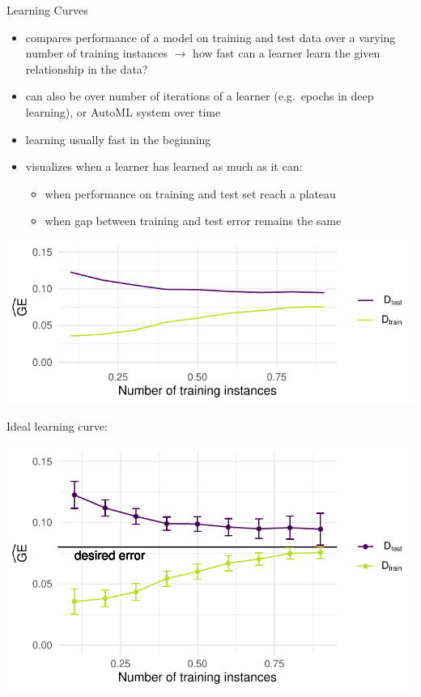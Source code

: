     \begin{frame}[c,allowframebreaks]{Learning Curves}

    \begin{itemize}
    \item compares performance of a model on training and test data over a varying number of training instances $\rightarrow$ how fast can a learner learn the given relationship in the data?
    \item can also be over number of iterations of a learner (e.g.\ epochs in
        deep learning), or AutoML system over time
    \item learning usually fast in the beginning
    \item visualizes when a learner has learned as much as it can:
    \begin{itemize}
    \item when performance on training and test set reach a plateau
    \item when gap between training and test error remains the same
    \end{itemize}
    \end{itemize}

    \begin{center}
    \includegraphics[height=.35\textheight]{images/learning-curve}
    \end{center}

    \framebreak

    Ideal learning curve:

    \begin{center}
    \includegraphics[height=.7\textheight]{images/learning-curve-ideal}
    \end{center}


\end{frame}
